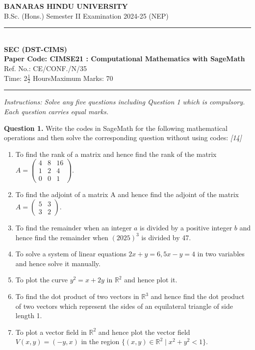 \documentclass[11pt,a4paper]{article}
\newcommand{\pts}[1]{\hfill \textit{[#1]}}
\begin{document}
\begin{center}
  {\large\bfseries BANARAS HINDU UNIVERSITY}\\[2pt]
  {\normalsize B.Sc. (Hons.) Semester II Examination 2024-25 (NEP)}\\[6pt]
  \rule{0.8\linewidth}{0.5pt}\\[6pt]
  {\large\bfseries SEC (DST-CIMS)}\\[4pt]
  {\large\bfseries Paper Code: CIMSE21 : Computational Mathematics with SageMath}\\[2pt]
  {\small Ref. No.: CE/CONF./N/35}\\[4pt]
  {\normalsize Time: 2$\frac{1}{2}$ Hours\hfill Maximum Marks: 70}
\end{center}

\rule{\linewidth}{0.4pt}

\smallskip

\noindent \textit{Instructions: Solve any five questions including Question 1 which is compulsory. Each question carries equal marks.}

\bigskip

\noindent \textbf{Question 1.} Write the codes in SageMath for the following mathematical operations and then solve the corresponding question without using codes: \pts{14}
\begin{enumerate}[label=(\alph*)]
  \item To find the rank of a matrix and hence find the rank of the matrix $A = \begin{pmatrix} 4 & 8 & 16 \\ 1 & 2 & 4 \\ 0 & 0 & 1 \end{pmatrix}$.
  \item To find the adjoint of a matrix A and hence find the adjoint of the matrix $A = \begin{pmatrix} 5 & 3 \\ 3 & 2 \end{pmatrix}$.
  \item To find the remainder when an integer $a$ is divided by a positive integer $b$ and hence find the remainder when $(2025)^3$ is divided by 47.
  \item To solve a system of linear equations $2x + y = 6, 5x - y = 4$ in two variables and hence solve it manually.
  \item To plot the curve $y^2 = x + 2y$ in $\mathbb{R}^2$ and hence plot it.
  \item To find the dot product of two vectors in $\mathbb{R}^3$ and hence find the dot product of two vectors which represent the sides of an equilateral triangle of side length 1.
  \item To plot a vector field in $\mathbb{R}^2$ and hence plot the vector field $V(x, y) = (-y, x)$ in the region $\{(x, y) \in \mathbb{R}^2 \mid x^2 + y^2 < 1\}$.
\end{enumerate}
\end{document}
